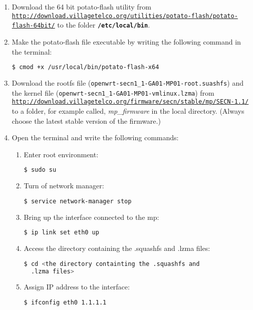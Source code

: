 \begin{enumerate}
\item Download the 64 bit potato-flash utility from \texttt{\url{http://download.villagetelco.org/utilities/potato-flash/potato-flash-64bit/}} to the folder \texttt{\textbf{/etc/local/bin}}.
\item Make the potato-flash file executable by writing the following command in the terminal:
\begin{lstlisting}[language=bash]
  $ cmod +x /usr/local/bin/potato-flash-x64
\end{lstlisting}
\item Download the rootfs file (\texttt{openwrt-secn1_1-GA01-MP01-root.suashfs}) and the kernel file (\texttt{openwrt-secn1_1-GA01-MP01-vmlinux.lzma}) from \texttt{\url{http://download.villagetelco.org/firmware/secn/stable/mp/SECN-1.1/}} to a folder, for example called, \textit{mp\_firmware} in the local directory. (Always choose the latest stable version of the firmware.)
\item Open the terminal and write the following commands: 
\begin{enumerate}
\item Enter root environment:
\noindent
\begin{lstlisting}[language=bash]
  $ sudo su
\end{lstlisting}

\item Turn of network manager:
\noindent 
\begin{lstlisting}[language=bash]
  $ service network-manager stop
\end{lstlisting}

\item Bring up the interface connected to the \gls{mp}:
\noindent 
\begin{lstlisting}[language=bash]
  $ ip link set eth0 up
\end{lstlisting}

\item Access the directory containing the .squashfs and .lzma files:
\noindent 
\begin{lstlisting}[language=bash]
  $ cd <the directory containting the .squashfs and 
  .lzma files>
\end{lstlisting}

\item Assign IP address to the interface:
\noindent 
\begin{lstlisting}[language=bash]
  $ ifconfig eth0 1.1.1.1
\end{lstlisting}


\end{enumerate}
\end{enumerate}
